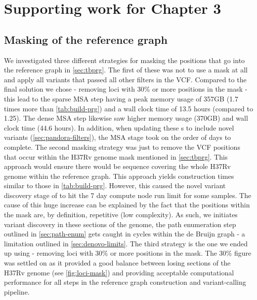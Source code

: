 \chapter{Supporting work for Chapter 3}


\section{Masking of the \mtb{} reference graph}
\label{app:mask}

We investigated three different strategies for masking the positions that go into the \mtb{} reference graph in \autoref{sec:tbprg}. The first of these was not to use a mask at all and apply all variants that passed all other filters in the \cryptic{} VCF. Compared to the final solution we chose - removing loci with 30\% or more positions in the mask - this lead to the sparse \prg{} MSA step having a peak memory usage of 357GB (1.7 times more than \autoref{tab:build-prg}) and a wall clock time of 13.5 hours (compared to 1.25). The dense \prg{} MSA step likewise saw higher memory usage (370GB) and wall clock time (44.6 hours). In addition, when updating these \prg{}s to include novel variants (\autoref{sec:pandora-filters}), the MSA stage took on the order of days to complete. 
The second masking strategy was just to remove the VCF positions that occur within the H37Rv genome mask mentioned in \autoref{sec:tbprg}. This approach would ensure there would be sequence covering the whole H37Rv genome within the reference graph. This approach yields construction times similar to those in \autoref{tab:build-prg}. However, this caused the novel variant discovery stage of \pandora{} to hit the 7 day compute node run limit for some samples. The cause of this huge increase can be explained by the fact that the positions within the mask are, by definition, repetitive (low complexity). As such, we \pandora{} initiates \denovo{} variant discovery in these sections of the genome, the path enumeration step outlined in \autoref{sec:path-enum} gets caught in cycles within the de Bruijn graph - a limitation outlined in \autoref{sec:denovo-limits}.
The third strategy is the one we ended up using - removing loci with 30\% or more positions in the mask. The 30\% figure was settled on as it provided a good balance between losing sections of the H37Rv genome (see \autoref{fig:loci-mask}) and providing acceptable computational performance for all steps in the reference graph construction and \pandora{} variant-calling pipeline.


